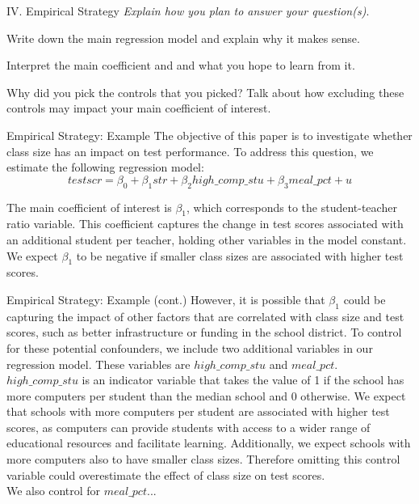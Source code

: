 \documentclass{./../Lectures/div_teaching_slides}
\begin{document}
\begin{frame}{IV. Empirical Strategy}
\textit{Explain how you plan to answer your question(s)}. \\
\begin{witemize}
  \item Write down the main regression model and explain why it makes sense. \\ \vspace{0.5em}
\begin{witemize}
\normalsize
  \item Interpret the main coefficient and and what you hope to learn from it. 
  \item Why did you pick the controls that you picked? Talk about how excluding these controls may impact your main coefficient of interest.
  \end{witemize}
\end{witemize}
\end{frame}

\begin{frame}{Empirical Strategy: Example}
\small
The objective of this paper is to investigate whether class size has an impact on test performance. To address this question, we estimate the following regression model:
$$ testscr = \beta_0 + \beta_1 str + \beta_2 high\_comp\_stu + \beta_3 meal\_pct + u $$

The main coefficient of interest is $\beta_1$, which corresponds to the student-teacher ratio variable. This coefficient captures the change in test scores associated with an additional student per teacher, holding other variables in the model constant. We expect $\beta_1$ to be negative if smaller class sizes are associated with higher test scores. 
\end{frame}

\begin{frame}{Empirical Strategy: Example (cont.)}
\small \vspace{-0.25em}
However, it is possible that $\beta_1$ could be capturing the impact of other factors that are correlated with class size and test scores, such as better infrastructure or funding in the school district. To control for these potential confounders, we include two additional variables in our regression model. These variables are $high\_comp\_stu$ and $meal\_pct$. \\ \vspace{0.5em}
$high\_comp\_stu$ is an indicator variable that takes the value of 1 if the school has more computers per student than the median school and 0 otherwise. We expect that schools with more computers per student are associated with higher test scores, as computers can provide students with access to a wider range of educational resources and facilitate learning. Additionally, we expect schools with more computers also to have smaller class sizes. Therefore omitting this control variable could overestimate the effect of class size on test scores. \\ \vspace{0.5em}
We also control for $meal\_pct$... 
\end{frame}
\end{document}
